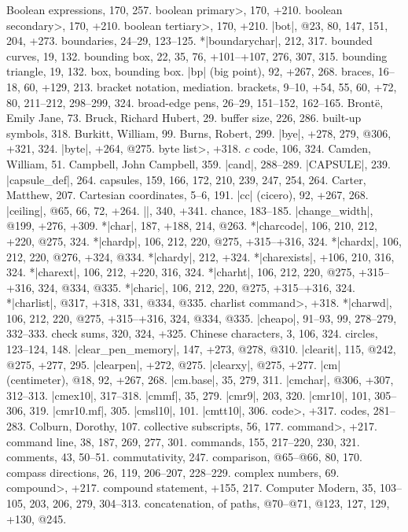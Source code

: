 Boolean expressions, 170, 257.
\<boolean primary>, 170, +210.
\<boolean secondary>, 170, +210.
\<boolean tertiary>, 170, +210.
|bot|, @23, 80, 147, 151, 204, +273.
boundaries, 24--29, 123--125.
*|boundarychar|, 212, 317.
bounded curves, 19, 132.
bounding box, 22, 35, 76, +101--+107, 276, 307, 315.
bounding triangle, 19, 132.
box, \see bounding box.
|bp| (big point), 92, +267, 268.
braces, 16--18, 60, +129, 213.
bracket notation, \see mediation.
brackets, 9--10, +54, 55, 60, +72, 80, 211--212, 298--299, 324.
broad-edge pens, 26--29, 151--152, 162--165.
Bront\"e, Emily Jane, 73.
Bruck, Richard Hubert, 29.
buffer size, 226, 286.
built-up symbols, 318.
Burkitt, William, 99.
Burns, Robert, 299.
|bye|, +278, 279, @306, +321, 324.
|byte|, +264, @275.
\<byte list>, +318.
\newletter
$c$ code, 106, 324.
Camden, William, 51.
Campbell, John Campbell, 359.
|cand|, 288--289.
|CAPSULE|, 239.
|capsule_def|, 264.
capsules, 159, 166, 172, 210, 239, 247, 254, 264.
Carter, Matthew, 207.
Cartesian coordinates, 5--6, 191.
|cc| (cicero), 92, +267, 268.
|ceiling|, @65, 66, 72, +264.
|\centerlargechars|, 340, +341.
chance, 183--185.
|change_width|, @199, +276, +309.
*|char|, 187, +188, 214, @263.
*|charcode|, 106, 210, 212, +220, @275, 324.
*|chardp|, 106, 212, 220, @275, +315--+316, 324.
*|chardx|, 106, 212, 220, @276, +324, @334.
*|chardy|, 212, +324.
*|charexists|, +106, 210, 316, 324.
*|charext|, 106, 212, +220, 316, 324.
*|charht|, 106, 212, 220, @275, +315--+316, 324, @334, @335.
*|charic|, 106, 212, 220, @275, +315--+316, 324.
*|charlist|, @317, +318, 331, @334, @335.
\<charlist command>, +318.
*|charwd|, 106, 212, 220, @275, +315--+316, 324, @334, @335.
|cheapo|, 91--93, 99, 278--279, 332--333.
check sums, 320, 324, +325.
Chinese characters, 3, 106, 324.
circles, 123--124, 148.
|clear_pen_memory|, 147, +273, @278, @310.
|clearit|, 115, @242, @275, +277, 295.
|clearpen|, +272, @275.
|clearxy|, @275, +277.
|cm| (centimeter), @18, 92, +267, 268.
|cm.base|, 35, 279, 311.
|cmchar|, @306, +307, 312--313.
|cmex10|, 317--318.
|cmmf|, 35, 279.
|cmr9|, 203, 320.
|cmr10|, 101, 305--306, 319.
|cmr10.mf|, 305.
|cmsl10|, 101.
|cmtt10|, 306.
\<code>, +317.
codes, 281--283.
Colburn, Dorothy, 107.
collective subscripts, 56, 177.
\<command>, +217.
command line, 38, 187, 269, 277, 301.
commands, 155, 217--220, 230, 321.
comments, 43, 50--51.
commutativity, 247.
comparison, @65--@66, 80, 170.
compass directions, 26, 119, 206--207, 228--229.
complex numbers, 69.
\<compound>, +217.
compound statement, +155, 217.
Computer Modern, 35, 103--105, 203, 206, 279, 304--313.
concatenation, of paths, @70--@71, @123, 127, 129, +130, @245.

